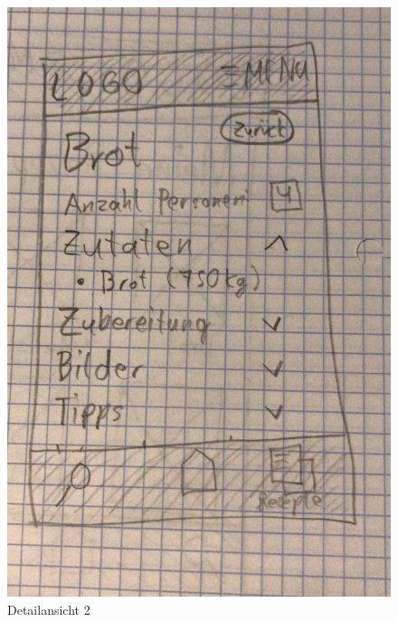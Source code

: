 \begin{figure}[H]
  \includegraphics[width=\linewidth]{./exercise13/Detailansicht2.jpeg}
  \caption{Detailansicht 2}
\end{figure}